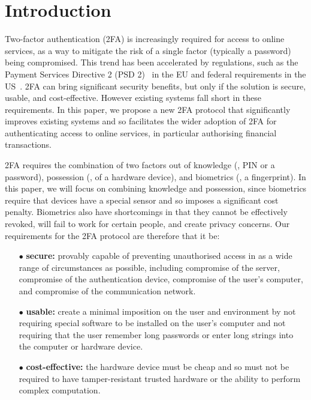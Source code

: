 


\section{Introduction}

Two-factor authentication (2FA) is increasingly required for access to online services, as a way to mitigate the risk of a single factor (typically a password) being compromised.
This trend has been accelerated by regulations, such as the Payment Services Directive 2 (PSD 2)~\cite{psd2} in the EU and federal requirements in the US~\cite{Zero-Trust-Cybersecurity}.
2FA can bring significant security benefits, but only if the solution is secure, usable, and cost-effective.
However existing systems fall short in these requirements.
In this paper, we propose a new 2FA protocol that significantly improves existing systems and so facilitates the wider adoption of 2FA for authenticating access to online services, in particular authorising financial transactions.

2FA requires the combination of two factors out of knowledge (\eg, PIN or a password), possession (\eg, of a hardware device), and biometrics (\eg, a fingerprint).
In this paper, we will focus on combining knowledge and possession, since biometrics require that devices have a special sensor and so imposes a significant cost penalty.
Biometrics also have shortcomings in that they cannot be effectively revoked, will fail to work for certain people, and create privacy concerns. Our requirements for the 2FA protocol are therefore that it be:%

\begin{itemize}
\item[$\bullet$]\textbf{secure:} provably capable of preventing unauthorised access in as a wide range of circumstances as possible, including compromise of the server, compromise of the authentication device, compromise of the user's computer, and compromise of the communication network.

\item[$\bullet$]\textbf{usable:} create a minimal imposition on the user and environment by not requiring special software to be installed on the user's computer and not requiring that the user remember long passwords or enter long strings into the computer or hardware device.

\item[$\bullet$]\textbf{cost-effective:} the hardware device must be cheap and so must not be required to have tamper-resistant trusted hardware or the ability to perform complex computation.
\end{itemize}

